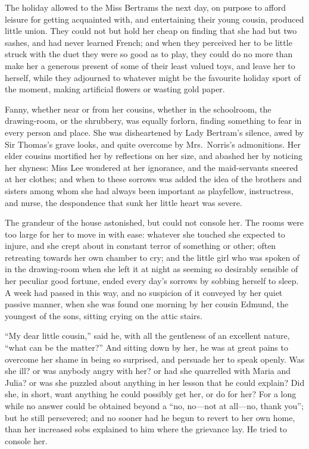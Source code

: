 The holiday allowed to the Miss Bertrams the next day,
on purpose to afford leisure for getting acquainted with,
and entertaining their young cousin, produced little union.
They could not but hold her cheap on finding that she
had but two sashes, and had never learned French; and when
they perceived her to be little struck with the duet they
were so good as to play, they could do no more than make
her a generous present of some of their least valued toys,
and leave her to herself, while they adjourned to whatever
might be the favourite holiday sport of the moment,
making artificial flowers or wasting gold paper.

Fanny, whether near or from her cousins, whether in
the schoolroom, the drawing-room, or the shrubbery,
was equally forlorn, finding something to fear in
every person and place.  She was disheartened by Lady
Bertram's silence, awed by Sir Thomas's grave looks,
and quite overcome by Mrs.\ Norris's admonitions.
Her elder cousins mortified her by reflections on her size,
and abashed her by noticing her shyness:  Miss Lee
wondered at her ignorance, and the maid-servants sneered
at her clothes; and when to these sorrows was added the idea
of the brothers and sisters among whom she had always
been important as playfellow, instructress, and nurse,
the despondence that sunk her little heart was severe.

The grandeur of the house astonished, but could not console her.
The rooms were too large for her to move in with ease:
whatever she touched she expected to injure, and she
crept about in constant terror of something or other;
often retreating towards her own chamber to cry;
and the little girl who was spoken of in the drawing-room
when she left it at night as seeming so desirably sensible
of her peculiar good fortune, ended every day's sorrows
by sobbing herself to sleep.  A week had passed in this way,
and no suspicion of it conveyed by her quiet passive manner,
when she was found one morning by her cousin Edmund,
the youngest of the sons, sitting crying on the attic stairs.

``My dear little cousin,'' said he, with all the gentleness
of an excellent nature, ``what can be the matter?''  And sitting
down by her, he was at great pains to overcome her shame
in being so surprised, and persuade her to speak openly.
Was she ill? or was anybody angry with her? or had she
quarrelled with Maria and Julia? or was she puzzled
about anything in her lesson that he could explain?
Did she, in short, want anything he could possibly get her,
or do for her?  For a long while no answer could be
obtained beyond a ``no, no---not at all---no, thank you'';
but he still persevered; and no sooner had he begun to
revert to her own home, than her increased sobs explained
to him where the grievance lay.  He tried to console her.

